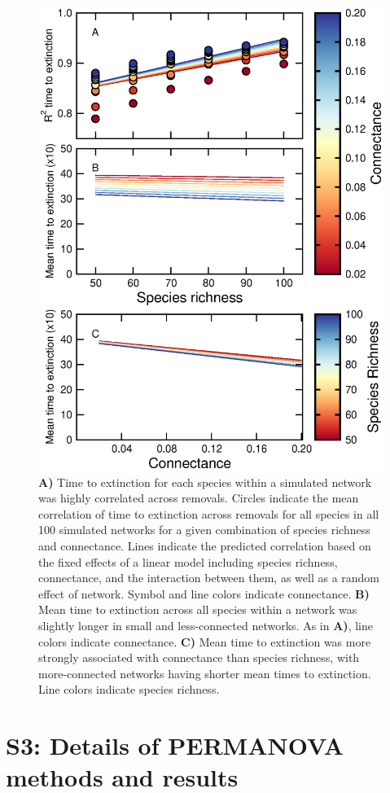 \documentclass[12pt]{article}
\begin{document}
\begin{spacing}{2.0}
		\begin{figure}[h!]
			\caption{\textbf{A)} Time to extinction for each species within a simulated network was highly correlated across removals. Circles indicate the mean correlation of time to extinction across removals for all species in all 100 simulated networks for a given combination of species richness and connectance. Lines indicate the predicted correlation based on the fixed effects of a linear model including species richness, connectance, and the interaction between them, as well as a random effect of network. Symbol and line colors indicate connectance. \textbf{B)} Mean time to extinction across all species within a network was slightly longer in small and less-connected networks. As in \textbf{A)}, line colors indicate connectance. \textbf{C)} Mean time to extinction was more strongly associated with connectance than species richness, with more-connected networks having shorter mean times to extinction. Line colors indicate species richness.}
			\label{extorder_corrs}
			\includegraphics[width=.75\textwidth]{figures/extinction_order/extorder_correlations.eps}
			\end{figure}		


\clearpage

\section*{S3: Details of PERMANOVA methods and results}


\end{spacing}
\end{document}
